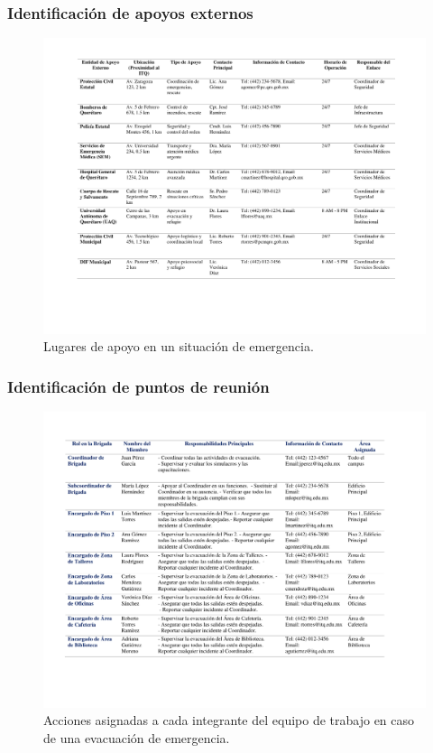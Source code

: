     \subsubsection{ Identificación de apoyos externos}
    \begin{figure}[H]
        \centering
        \includegraphics[trim = {20mm 10mm 10mm 16mm},clip,scale=0.30]{1/img/apoyo.pdf}
        \caption{Lugares de apoyo en un situación de emergencia. }
        \label{fig:Apoyo}
    \end{figure}
    \subsubsection{Identificación de puntos de reunión}
    
    \begin{figure}[H]
        \centering
        \includegraphics[trim = {20mm 10mm 10mm 16mm},clip,scale=0.30]{1/img/brigada.pdf}
        \caption{Acciones asignadas a cada integrante del equipo de trabajo en caso de una evacuación de emergencia. }
        \label{fig:Brigada}
    \end{figure}
